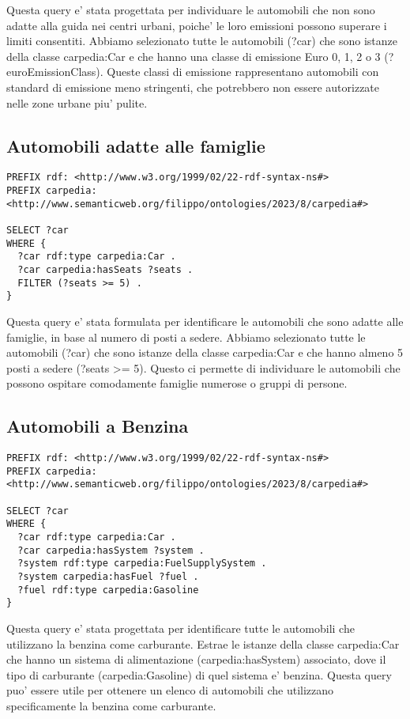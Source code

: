 Questa query e' stata progettata per individuare le automobili che non sono adatte alla guida nei centri urbani,
poiche' le loro emissioni possono superare i limiti consentiti.
Abbiamo selezionato tutte le automobili (?car) che sono istanze della classe carpedia:Car e che hanno una
classe di emissione Euro 0, 1, 2 o 3 (?euroEmissionClass).
Queste classi di emissione rappresentano automobili con standard di emissione meno stringenti,
che potrebbero non essere autorizzate nelle zone urbane piu' pulite.

\subsection{Automobili adatte alle famiglie}

\begin{lstlisting}[language=SPARQL]
PREFIX rdf: <http://www.w3.org/1999/02/22-rdf-syntax-ns#>
PREFIX carpedia: <http://www.semanticweb.org/filippo/ontologies/2023/8/carpedia#>

SELECT ?car
WHERE {
  ?car rdf:type carpedia:Car .
  ?car carpedia:hasSeats ?seats .
  FILTER (?seats >= 5) .
}
\end{lstlisting}


Questa query e' stata formulata per identificare le automobili che sono adatte alle famiglie, in base al numero
di posti a sedere. Abbiamo selezionato tutte le automobili (?car) che sono istanze della classe carpedia:Car e
che hanno almeno 5 posti a sedere (?seats >= 5). Questo ci permette di individuare le automobili che possono
ospitare comodamente famiglie numerose o gruppi di persone.

\subsection{Automobili a Benzina}

\begin{lstlisting}[language=SPARQL]
PREFIX rdf: <http://www.w3.org/1999/02/22-rdf-syntax-ns#>
PREFIX carpedia: <http://www.semanticweb.org/filippo/ontologies/2023/8/carpedia#>

SELECT ?car
WHERE {
  ?car rdf:type carpedia:Car .
  ?car carpedia:hasSystem ?system .
  ?system rdf:type carpedia:FuelSupplySystem .
  ?system carpedia:hasFuel ?fuel .
  ?fuel rdf:type carpedia:Gasoline
}
\end{lstlisting}


Questa query e' stata progettata per identificare tutte le automobili che utilizzano la benzina come carburante.
Estrae le istanze della classe carpedia:Car che hanno un sistema di alimentazione (carpedia:hasSystem) associato,
dove il tipo di carburante (carpedia:Gasoline) di quel sistema e' benzina.
Questa query puo' essere utile per ottenere un elenco di automobili che utilizzano specificamente la benzina
come carburante.

